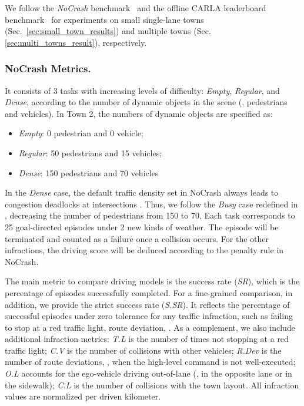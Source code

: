 We follow the \emph{NoCrash} benchmark~\cite{Codevilla:2019} and the offline CARLA leaderboard benchmark~\cite{Zhang:2021,Hu:2022} for experiments on small single-lane towns (Sec.~\ref{sec:small_town_results}) and multiple towns (Sec.~ \ref{sec:multi_towns_result}), respectively.


\subsubsection{NoCrash Metrics.}\label{nocrash_metrics}
\hspace{1pc}It consists of 3 tasks with increasing levels of difficulty: \emph{Empty}, \emph{Regular}, and \emph{Dense}, according to the number of dynamic objects in the scene ({\ie}, pedestrians and vehicles). 
In Town 2, the numbers of dynamic objects are specified as:
\begin{itemize}
	\item \emph{Empty}: 0 pedestrian and 0 vehicle;
	\item \emph{Regular}: 50 pedestrians and 15 vehicles;
	\item \emph{Dense}: 150 pedestrians and 70 vehicles
\end{itemize}
In the \emph{Dense} case, the default traffic density set in NoCrash always leads to congestion deadlocks at intersections \cite{Zhang:2021}. 
Thus, we follow the \emph{Busy} case redefined in \cite{Zhang:2021}, decreasing the number of pedestrians from 150 to 70. 
Each task corresponds to 25 goal-directed episodes under 2 new kinds of weather.
The episode will be terminated and counted as a failure once a collision occurs. 
For the other infractions, the driving score will be deduced according to the penalty rule in NoCrash. 


The main metric to compare driving models is the success rate (\emph{SR}), which is the percentage of episodes successfully completed. 
For a fine-grained comparison, in addition, we provide the strict success rate (\emph{S.SR}). 
It reflects the percentage of successful episodes under zero tolerance for any traffic infraction, such as failing to stop at a red traffic light, route deviation, {\etc}. 
As a complement, we also include additional infraction metrics: \emph{T.L} is the number of times not stopping at a red traffic light; 
\emph{C.V} is the number of collisions with other vehicles; 
\emph{R.Dev} is the number of route deviations, {\ie}, when the high-level command is not well-executed; 
\emph{O.L} accounts for the ego-vehicle driving out-of-lane ({\eg}, in the opposite lane or in the sidewalk); 
\emph{C.L} is the number of collisions with the town layout. 
All infraction values are normalized per driven kilometer.


